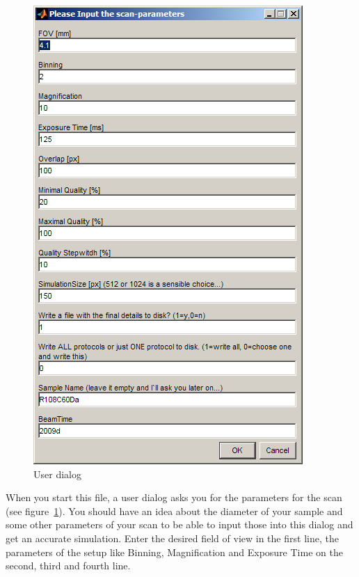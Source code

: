 \documentclass[a4paper]{scrartcl}
\begin{document}
\begin{figure}
	\centering
		\includegraphics[width=\linewidth]{img/input}
	\caption{User dialog}
	\label{fig:user dialog}
\end{figure}

When you start this file, a user dialog asks you for the parameters for the scan (see figure~\ref{fig:user dialog}). You should have an idea about the diameter of your sample and some other parameters of your scan to be able to input those into this dialog and get an accurate simulation. Enter the desired field of view in the first line, the parameters of the setup like Binning, Magnification and Exposure Time on the second, third and fourth line.
\end{document}
